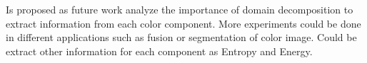 Is proposed as future work analyze the importance of domain decomposition to extract information from each color component. More experiments could be done in different applications such as fusion or segmentation of color image. Could be extract other information for each component as Entropy and Energy.
 



